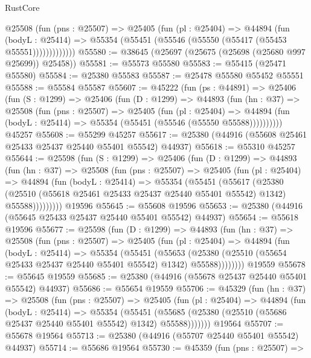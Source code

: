 \begin{lexlean}{RustCore}
\begin{coremodule}
            @25508
              (fun (pns : @25507) =>
              @25405
                (fun (pl : @25404) =>
                @44894
                  (fun (bodyL : @25414) =>
                  @55354 (@55451 (@55546 (@55550 (@55417 (@55453 @55551)))))))))))))
@55580 := @38645 (@25697 (@25675 (@25698 (@25680 @997 @25699)) @25458))
@55581 := @55573 @55580
@55583 := @55415 (@25471 @55580)
@55584 := @25380 @55583
@55587 := @25478 @55580 @55452 @55551
@55588 := @55584 @55587
@55607 := @45222
    (fun (ps : @44891) =>
    @25406
      (fun (S : @1299) =>
      @25406
        (fun (D : @1299) =>
        @44893
          (fun (hn : @37) =>
          @25508
            (fun (pns : @25507) =>
            @25405
              (fun (pl : @25404) =>
              @44894 (fun (bodyL : @25414) => @55354 (@55451 (@55546 (@55550 @55588))))))))))
    @45257
@55608 := @55299 @45257
@55617 := @25380 (@44916 (@55608 @25461 @25433 @25437 @25440 @55401 @55542) @44937)
@55618 := @55310 @45257
@55644 := @25598
    (fun (S : @1299) =>
    @25406
      (fun (D : @1299) =>
      @44893
        (fun (hn : @37) =>
        @25508
          (fun (pns : @25507) =>
          @25405
            (fun (pl : @25404) =>
            @44894
              (fun (bodyL : @25414) =>
              @55354
                (@55451
                  (@55617
                    (@25380
                      (@25510 (@55618 @25461 @25433 @25437 @25440 @55401 @55542) @1342)
                      @55588)))))))))
    @19596
@55645 := @55608 @19596
@55653 := @25380 (@44916 (@55645 @25433 @25437 @25440 @55401 @55542) @44937)
@55654 := @55618 @19596
@55677 := @25598
    (fun (D : @1299) =>
    @44893
      (fun (hn : @37) =>
      @25508
        (fun (pns : @25507) =>
        @25405
          (fun (pl : @25404) =>
          @44894
            (fun (bodyL : @25414) =>
            @55354
              (@55451
                (@55653
                  (@25380 (@25510 (@55654 @25433 @25437 @25440 @55401 @55542) @1342) @55588))))))))
    @19559
@55678 := @55645 @19559
@55685 := @25380 (@44916 (@55678 @25437 @25440 @55401 @55542) @44937)
@55686 := @55654 @19559
@55706 := @45329
    (fun (hn : @37) =>
    @25508
      (fun (pns : @25507) =>
      @25405
        (fun (pl : @25404) =>
        @44894
          (fun (bodyL : @25414) =>
          @55354
            (@55451
              (@55685 (@25380 (@25510 (@55686 @25437 @25440 @55401 @55542) @1342) @55588)))))))
    @19564
@55707 := @55678 @19564
@55713 := @25380 (@44916 (@55707 @25440 @55401 @55542) @44937)
@55714 := @55686 @19564
@55730 := @45359
    (fun (pns : @25507) =>

\end{coremodule}
\end{lexlean}
